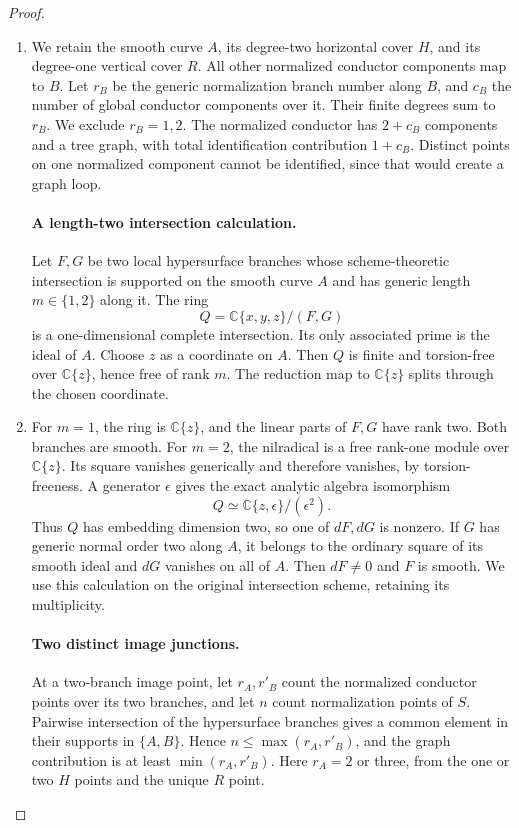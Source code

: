 \begin{proof}

\begin{enumerate}[label={$\langle1\rangle$\arabic*.},leftmargin=*]
\item We retain the smooth curve $A$, its degree-two horizontal
cover $H$, and its degree-one vertical cover $R$. All other
normalized conductor components map to $B$. Let $r_B$ be
the generic normalization branch number along $B$, and
$c_B$ the number of global conductor components over it.
Their finite degrees sum to $r_B$. We exclude $r_B=1,2$.
The normalized conductor has $2+c_B$ components and a tree
graph, with total identification contribution $1+c_B$.
Distinct points on one normalized component cannot be
identified, since that would create a graph loop.

\paragraph{A length-two intersection calculation.}
Let $F,G$ be two local hypersurface branches whose
scheme-theoretic intersection is supported on the smooth
curve $A$ and has generic length $m\in\{1,2\}$ along it.
The ring
\[
                 Q=\mathbb C\{x,y,z\}/(F,G)
\]
is a one-dimensional complete intersection. Its only
associated prime is the ideal of $A$. Choose $z$ as a
coordinate on $A$. Then $Q$ is finite and torsion-free
over $\mathbb C\{z\}$, hence free of rank $m$. The
reduction map to $\mathbb C\{z\}$ splits through the
chosen coordinate.

\item For $m=1$, the ring is $\mathbb C\{z\}$, and the linear
parts of $F,G$ have rank two. Both branches are smooth.
For $m=2$, the nilradical is a free rank-one module over
$\mathbb C\{z\}$. Its square vanishes generically and
therefore vanishes, by torsion-freeness. A generator
$\epsilon$ gives the exact analytic algebra isomorphism
\[
                    Q\simeq\mathbb C\{z,\epsilon\}/(\epsilon^2).
                                                            \tag{4.56a}
\]
Thus $Q$ has embedding dimension two, so one of $dF,dG$
is nonzero. If $G$ has generic normal order two along $A$,
it belongs to the ordinary square of its smooth ideal and
$dG$ vanishes on all of $A$. Then $dF\ne0$ and $F$ is
smooth. We use this calculation on the original intersection
scheme, retaining its multiplicity.

\paragraph{Two distinct image junctions.}
At a two-branch image point, let $r_A,r'_B$ count the
normalized conductor points over its two branches, and
let $n$ count normalization points of $S$. Pairwise
intersection of the hypersurface branches gives a common
element in their supports in $\{A,B\}$. Hence
$n\le\max(r_A,r'_B)$, and the graph contribution is at
least $\min(r_A,r'_B)$. Here $r_A=2$ or three, from the
one or two $H$ points and the unique $R$ point.


\end{enumerate}
\end{proof}
